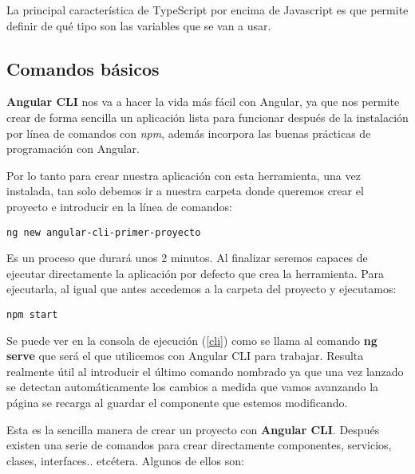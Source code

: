 La principal característica de TypeScript por encima de Javascript es que permite definir de qué tipo son las variables que se van a usar.

\subsection{Comandos básicos}\label{cbasicos}
\textbf{Angular CLI} nos va a hacer la vida más fácil con Angular, ya que nos permite crear de forma sencilla un aplicación lista para funcionar después de la instalación por línea de comandos con \emph{npm}, además incorpora las buenas prácticas de programación con Angular. 


Por lo tanto para crear nuestra aplicación con esta herramienta, una vez instalada, tan solo debemos ir a nuestra carpeta donde queremos crear el proyecto e introducir en la línea de comandos: 
	\lstset{language=C, breaklines=true, basicstyle=\footnotesize}
		\begin{lstlisting}[frame=single]
		ng new angular-cli-primer-proyecto
    	\end{lstlisting}
 
 Es un proceso que durará unos 2 minutos.  Al finalizar seremos capaces de ejecutar directamente la aplicación por defecto que crea la herramienta. Para ejecutarla, al igual que antes accedemos a la carpeta del proyecto y ejecutamos:
 	\lstset{language=C, breaklines=true, basicstyle=\footnotesize}
		\begin{lstlisting}[frame=single]
		 npm start
    	\end{lstlisting}
    	
    	\label{cli}
    	
 Se puede ver en la consola de ejecución (\ref{cli}) como se llama al comando \textbf{ng serve} que será el que utilicemos con Angular CLI para trabajar. Resulta realmente útil al introducir el último comando nombrado ya que una vez lanzado se detectan automáticamente los cambios a medida que vamos avanzando la página se recarga al guardar el componente que estemos modificando.  
    	
    	
   Esta es la sencilla manera de crear un proyecto con \textbf{Angular CLI}. Después existen una serie de comandos para crear directamente componentes, servicios, clases, interfaces.. etcétera.  Algunos de ellos son:
   

